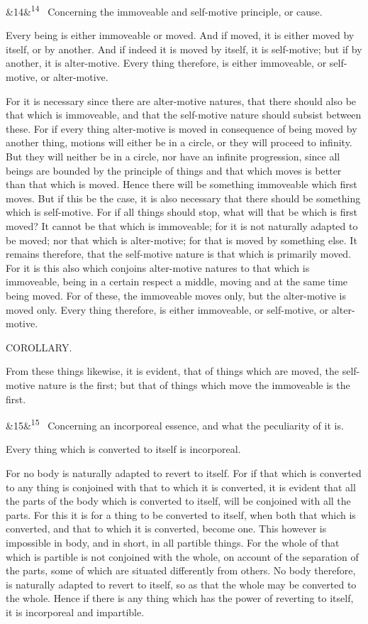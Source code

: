 \documentclass[12pt]{article}
\newcommand{\para}[1][]{\par\noindent\ifx&#1&\else\textsuperscript{\footnotesize #1}~\fi}
\begin{document}
\para[14] Concerning the immoveable and self-motive principle, or cause.

Every being is either immoveable or moved. And if moved, it is either moved by itself, or by another. And if indeed it is moved by itself, it is self-motive; but if by another, it is alter-motive. Every thing therefore, is either immoveable, or self-motive, or alter-motive.

For it is necessary since there are alter-motive natures, that there should also be that which is immoveable, and that the self-motive nature should subsist between these. For if every thing alter-motive is moved in consequence of being moved by another thing, motions will either be in a circle, or they will proceed to infinity. But they will neither be in a circle, nor have an infinite progression, since all beings are bounded by the principle of things and that which moves is better than that which is moved. Hence there will be something immoveable which first moves. But if this be the case, it is also necessary that there should be something which is self-motive. For if all things should stop, what will that be which is first moved? It cannot be that which is immoveable; for it is not naturally adapted to be moved; nor that which is alter-motive; for that is moved by something else. It remains therefore, that the self-motive nature is that which is primarily moved. For it is this also which conjoins alter-motive natures to that which is immoveable, being in a certain respect a middle, moving and at the same time being moved. For of these, the immoveable moves only, but the alter-motive is moved only. Every thing therefore, is either immoveable, or self-motive, or alter-motive.

COROLLARY.

From these things likewise, it is evident, that of things which are moved, the self-motive nature is the first; but that of things which move the immoveable is the first.

\para[15] Concerning an incorporeal essence, and what the peculiarity of it is.

Every thing which is converted to itself is incorporeal.

For no body is naturally adapted to revert to itself. For if that which is converted to any thing is conjoined with that to which it is converted, it is evident that all the parts of the body which is converted to itself, will be conjoined with all the parts. For this it is for a thing to be converted to itself, when both that which is converted, and that to which it is converted, become one. This however is impossible in body, and in short, in all partible things. For the whole of that which is partible is not conjoined with the whole, on account of the separation of the parts, some of which are situated differently from others. No body therefore, is naturally adapted to revert to itself, so as that the whole may be converted to the whole. Hence if there is any thing which has the power of reverting to itself, it is incorporeal and impartible.
\end{document}
